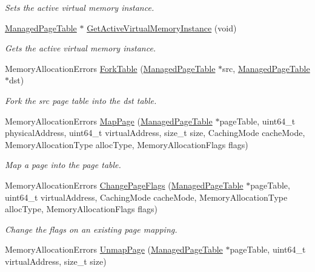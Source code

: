 \begin{DoxyCompactItemize}
\begin{DoxyCompactList}\small\item\em Sets the active virtual memory instance. \end{DoxyCompactList}\item 
\hyperlink{structManagedPageTable}{Managed\+Page\+Table} $\ast$ \hyperlink{group__memory__hal_ga16a884ac1d3f8592c51696e598c3f388}{Get\+Active\+Virtual\+Memory\+Instance} (void)
\begin{DoxyCompactList}\small\item\em Gets the active virtual memory instance. \end{DoxyCompactList}\item 
Memory\+Allocation\+Errors \hyperlink{group__memory__hal_ga55792beaa12c8a01cb7a958f25298a4a}{Fork\+Table} (\hyperlink{structManagedPageTable}{Managed\+Page\+Table} $\ast$src, \hyperlink{structManagedPageTable}{Managed\+Page\+Table} $\ast$dst)
\begin{DoxyCompactList}\small\item\em Fork the src page table into the dst table. \end{DoxyCompactList}\item 
Memory\+Allocation\+Errors \hyperlink{group__memory__hal_gaf12f8fa8069d8c3c8c6d3662743965ab}{Map\+Page} (\hyperlink{structManagedPageTable}{Managed\+Page\+Table} $\ast$page\+Table, uint64\+\_\+t physical\+Address, uint64\+\_\+t virtual\+Address, size\+\_\+t size, Caching\+Mode cache\+Mode, Memory\+Allocation\+Type alloc\+Type, Memory\+Allocation\+Flags flags)
\begin{DoxyCompactList}\small\item\em Map a page into the page table. \end{DoxyCompactList}\item 
Memory\+Allocation\+Errors \hyperlink{group__memory__hal_ga5b899ceffe056eb4accb4ce051a35c3c}{Change\+Page\+Flags} (\hyperlink{structManagedPageTable}{Managed\+Page\+Table} $\ast$page\+Table, uint64\+\_\+t virtual\+Address, Caching\+Mode cache\+Mode, Memory\+Allocation\+Type alloc\+Type, Memory\+Allocation\+Flags flags)
\begin{DoxyCompactList}\small\item\em Change the flags on an existing page mapping. \end{DoxyCompactList}\item 
Memory\+Allocation\+Errors \hyperlink{group__memory__hal_gaeadb7160dc7c72db80b7d2e63525dec5}{Unmap\+Page} (\hyperlink{structManagedPageTable}{Managed\+Page\+Table} $\ast$page\+Table, uint64\+\_\+t virtual\+Address, size\+\_\+t size)

\end{DoxyCompactItemize}
